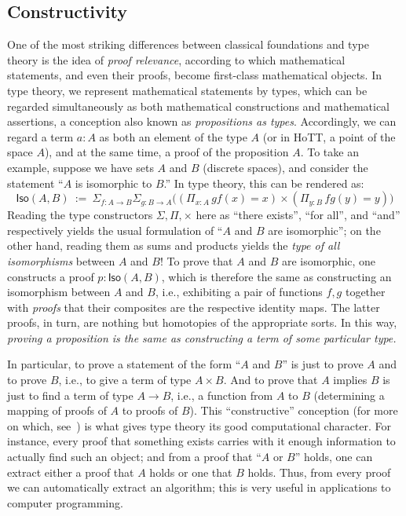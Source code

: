 {%


\subsection*{Constructivity} 


One of the most striking differences between classical foundations and type theory is the idea of \emph{proof relevance}, according to which mathematical statements, and even their proofs, become first-class mathematical objects.
In type theory, we represent mathematical statements by types, which can be regarded simultaneously as both mathematical constructions and mathematical assertions, a conception also known as \emph{propositions as types}.
Accordingly, we can regard a term $a : A$ as both an element of the type $A$ (or in HoTT, a point of the space $A$), and at the same time, a proof of the proposition $A$.
To take an example, suppose we have sets $A$ and $B$ (discrete spaces), and consider the statement ``$A$ is isomorphic to $B$.''
In type theory, this can be rendered as:
\[
\mathsf{Iso}(A,B)\ :=\ \Sigma_{f : A\to B}\Sigma_{g : B\to A}\big((\Pi_{x:A}\, gf(x) = x) \times (\Pi_{y:B}\, fg(y) = y)\big)
\]
%
Reading the type constructors $\Sigma, \Pi, \times$  here  as ``there exists'', ``for all'', and ``and'' respectively yields the usual formulation of ``$A$ and $B$ are isomorphic''; on the other hand, reading them as sums and products yields the \emph{type of all isomorphisms} between $A$ and $B$!  To prove that $A$ and $B$ are isomorphic, one  constructs a proof $p : \mathsf{Iso}(A,B)$, which is therefore the same  as constructing an isomorphism between $A$ and $B$, i.e., exhibiting a pair of functions $f, g$ together with \emph{proofs} that their composites are the respective identity maps.  The latter proofs, in turn, are nothing but homotopies of the appropriate sorts.  In this way, \emph{proving a proposition is the same as constructing a term of some particular type.}

In particular, to prove a statement of the form ``$A$ and $B$'' is just to prove $A$ and to prove $B$, i.e., to give a term of type $A\times B$.
And to prove that $A$ implies $B$ is just to find a term of type $A\to B$, i.e., a function from $A$ to $B$ (determining a mapping of proofs of $A$ to proofs of $B$).
This ``constructive'' conception (for more on which, see~\cite{kolmogorov,BHK}) is what gives type theory its good computational character.
For instance, every proof that something exists carries with it enough information to actually find such an object; and from a proof that  ``$A$ or $B$'' holds, one can extract either a proof that $A$ holds or one that $B$ holds.
Thus, from every proof we can automatically extract an algorithm; this is very useful in applications to computer programming.

}
